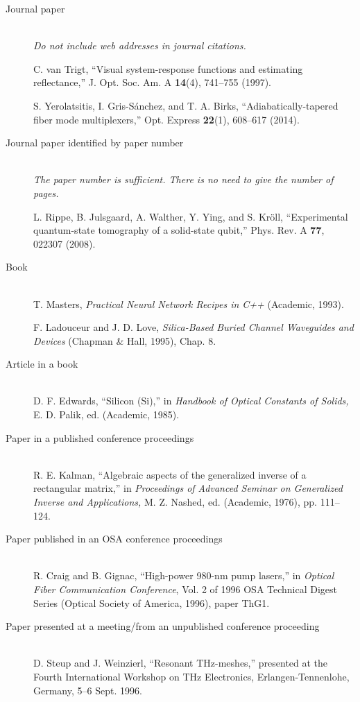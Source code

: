 \documentclass[10pt]{article}
\begin{document}
\begin{description}
\item[Journal paper] \hfill\\
{\itshape Do not include web addresses in journal citations.}

C. van Trigt, ``Visual system-response functions and estimating reflectance,'' %
   J. Opt. Soc. Am. A {\bfseries 14}(4), 741--755 (1997).

S. Yerolatsitis, I. Gris-S\'anchez, and T. A. Birks,
``Adiabatically-tapered fiber mode multiplexers,'' Opt. Express {\bfseries 22}(1), 608--617 (2014).

\item[Journal paper identified by paper number] \hfill\\
{\itshape The paper number is sufficient. There is no need to give the number of pages.}

L. Rippe, B. Julsgaard, A. Walther, Y. Ying, and S. Kr\"oll,
``Experimental quantum-state tomography of a solid-state qubit,'' Phys. Rev. A {\bfseries 77}, 022307 (2008).

\item[Book] \hfill\\
T. Masters, {\itshape Practical Neural Network Recipes in C++} (Academic, 1993).

F. Ladouceur and J. D. Love, \textit{Silica-Based Buried Channel Waveguides and Devices} (Chapman \& Hall, 1995), Chap. 8.

\item[Article in a book] \hfill\\
D. F. Edwards, ``Silicon (Si),'' in {\itshape Handbook of Optical Constants of Solids,} E. D. Palik, ed. (Academic, 1985).

\item[Paper in a published conference proceedings] \hfill\\
R. E. Kalman, ``Algebraic aspects of the generalized inverse of a
rectangular matrix,'' in {\itshape Proceedings of Advanced Seminar on
Generalized Inverse and Applications,} M. Z. Nashed, ed. (Academic, 1976), pp. 111--124.

\item[Paper published in an OSA conference proceedings] \hfill\\
R. Craig and B. Gignac, ``High-power 980-nm pump lasers,'' in
{\itshape Optical Fiber Communication Conference}, Vol. 2 of 1996 OSA Technical Digest Series
(Optical Society of America, 1996), paper ThG1.

\item[Paper presented at a meeting/from an unpublished conference proceeding] \hfill\\
D. Steup and J. Weinzierl, ``Resonant THz-meshes,'' presented at the
Fourth International Workshop on THz Electronics,
Erlangen-Tennenlohe, Germany, 5--6 Sept. 1996.


\end{description}
\end{document}
